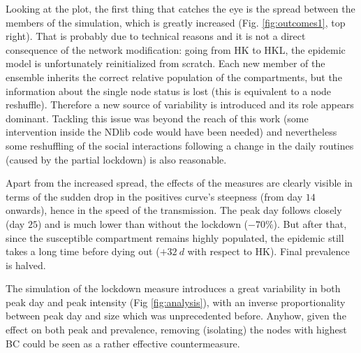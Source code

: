 \documentclass[DIV=12, BCOR=0pt]{scrartcl}  %
\begin{document}
	Looking at the plot, the first thing that catches the eye is the spread between the members of the simulation, which is greatly increased (Fig. \ref{fig:outcomes1}, top right). That is probably due to technical reasons and it is not a direct consequence of the network modification: going from HK to HKL, the epidemic model is unfortunately reinitialized from scratch. Each new member of the ensemble inherits the correct relative population of the compartments, but the information about the single node status is lost (this is equivalent to a node reshuffle). Therefore a new source of variability is introduced and its role appears dominant. Tackling this issue was beyond the reach of this work (some intervention inside the NDlib code would have been needed) and nevertheless some reshuffling of the social interactions following a change in the daily routines (caused by the partial lockdown) is also reasonable.
	
	Apart from the increased spread, the effects of the measures are clearly visible in terms of the sudden drop in the positives curve's steepness (from day $14$ onwards), hence in the speed of the transmission. The peak day follows closely (day $25$) and is much lower than without the lockdown ($- 70 \%$). But after that, since the susceptible compartment remains highly populated, the epidemic still takes a long time before dying out ($+ 32 \ d$ with respect to HK). Final prevalence is halved.
	
	The simulation of the lockdown measure introduces a great variability in both peak day and peak intensity (Fig \ref{fig:analysis}), with an inverse proportionality between peak day and size	which was unprecedented before.
	Anyhow, given the effect on both peak and prevalence, removing (isolating) the nodes with highest BC could be seen as a rather effective countermeasure.
 	
\end{document}
